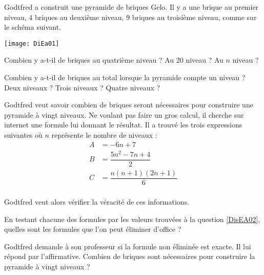 \begin{exercice}
Godtfred a construit une pyramide de briques Gelo. Il y a une brique au premier niveau, 4 briques au deuxième niveau, 9 briques au troisième niveau, comme sur le schéma suivant.

\begin{center}
\texttt{[image: DiEa01]}
\end{center}

\begin{colenumerate}{1} 
\item \label{DisEA02} Combien y a-t-il de briques au quatrième niveau ? Au 20 niveau ? Au $n$ niveau ?
\item Combien y a-t-il de briques au total lorsque la pyramide compte un niveau ? Deux niveaux ? Trois niveaux ? Quatre niveaux ?

Godtfred veut savoir combien de briques seront nécessaires pour construire une pyramide à vingt niveaux. Ne voulant pas faire un gros calcul, il cherche sur internet une formule lui donnant le résultat. Il a trouvé les trois expressions suivantes où $n$ représente le nombre de niveaux :
\begin{align*}
    A &= - 6n + 7 \\
    B &= \dfrac{5n^2 - 7n +4}{2} \\
    C &= \dfrac{n(n+1)(2n+1)}{6} \\
\end{align*}

Godtfred veut alors vérifier la véracité de ces informations.
\item En testant chacune des formules par les valeurs trouvées à la question \ref{DisEA02}, quelles sont les formules que l'on peut éliminer d'office ?
\item Godtfred demande à son professeur si la formule non éliminée est exacte. Il lui répond par l'affirmative. Combien de briques sont nécessaires pour construire la pyramide à vingt niveaux ?
\end{colenumerate} 
\end{exercice}

